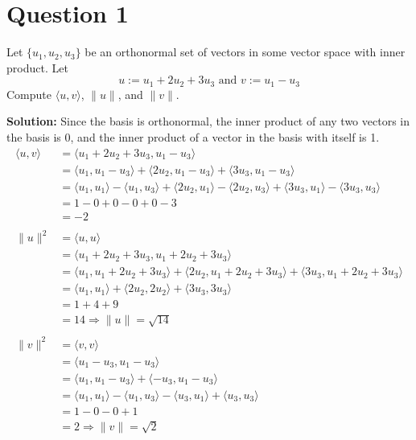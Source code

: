 \documentclass{article}
\begin{document}
\section*{Question 1}
Let $\{u_1, u_2, u_3\}$ be an orthonormal set of vectors in some vector space with inner product.
Let $$ u:= u_1 + 2u_2 + 3u_3 \text{ and } v:= u_1 - u_3 $$
Compute $\langle u, v \rangle$, $\|u\|$, and $\|v\|$.

\vspace{0.5cm}
\noindent\textbf{Solution:} Since the basis is orthonormal, the inner product of any two vectors in the basis is 0,
and the inner product of a vector in the basis with itself is 1.
\begin{align*}
    \langle u, v \rangle &= \langle u_1 + 2u_2 + 3u_3, u_1 - u_3 \rangle \\
    &= \langle u_1, u_1 - u_3 \rangle + \langle 2u_2, u_1 - u_3 \rangle + \langle 3u_3, u_1 - u_3 \rangle \\
    &= \langle u_1, u_1 \rangle - \langle u_1, u_3 \rangle + \langle 2u_2, u_1 \rangle - \langle 2u_2, u_3 \rangle + \langle 3u_3, u_1 \rangle - \langle 3u_3, u_3 \rangle \\
    &= 1 - 0 + 0 - 0 + 0 - 3 \\
    &= -2 \\
    \\
    \|u\|^2 &= \langle u, u \rangle \\
    &= \langle u_1 + 2u_2 + 3u_3, u_1 + 2u_2 + 3u_3 \rangle \\
    &= \langle u_1, u_1 + 2u_2 + 3u_3 \rangle + \langle 2u_2, u_1 + 2u_2 + 3u_3 \rangle + \langle 3u_3, u_1 + 2u_2 + 3u_3 \rangle \\
    &= \langle u_1, u_1 \rangle + \langle 2u_2, 2u_2 \rangle + \langle 3u_3, 3u_3 \rangle \\
    &= 1 + 4 + 9 \\
    &= 14 \Longrightarrow \|u\| = \sqrt{14} \\
    \\
    \|v\|^2 &= \langle v, v \rangle \\
    &= \langle u_1 - u_3, u_1 - u_3 \rangle \\
    &= \langle u_1, u_1 - u_3 \rangle + \langle -u_3, u_1 - u_3 \rangle \\
    &= \langle u_1, u_1 \rangle - \langle u_1, u_3 \rangle - \langle u_3, u_1 \rangle + \langle u_3, u_3 \rangle \\
    &= 1 - 0 - 0 + 1 \\
    &= 2 \Longrightarrow \|v\| = \sqrt{2} \\
\end{align*}
\end{document}
